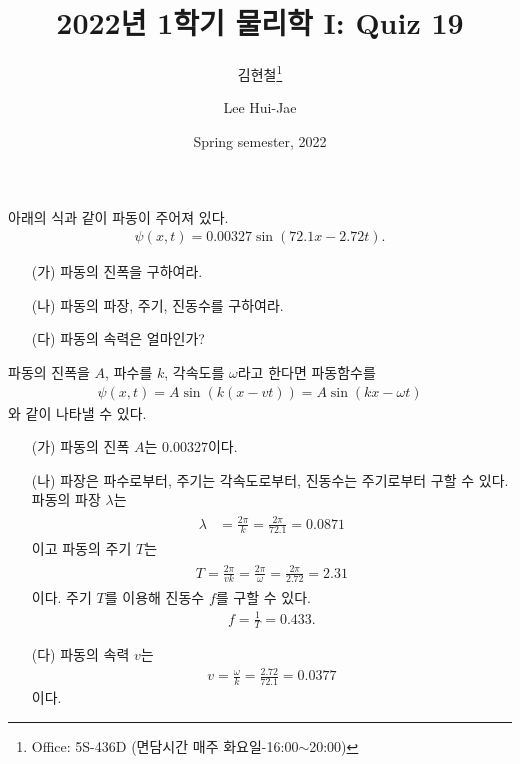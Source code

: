 \documentclass[floatfix,nofootinbib,superscriptaddress,fleqn]{revtex4-2}
\begin{document}
\title{\Large 2022년 1학기 물리학 I: Quiz 19}
\author{김현철\footnote{Office: 5S-436D (면담시간 매주
    화요일-16:00$\sim$20:00)}} 
\author{Lee Hui-Jae} 
\date{Spring semester, 2022}


\vspace{1.cm}

\maketitle

\vspace{1.cm}
아래의 식과 같이 파동이 주어져 있다. 
\begin{align}
  \label{eq:2}
\psi(x,t) = 0.00327 \sin(72.1x-2.72 t).  
\end{align}
\begin{itemize}
\item[(가)] 파동의 진폭을 구하여라.
\item[(나)] 파동의 파장, 주기, 진동수를 구하여라.
\item[(다)] 파동의 속력은 얼마인가?
\end{itemize}
\vspace{1.cm}
파동의 진폭을 $A$, 파수를 $k$, 각속도를 $\omega$라고 한다면 파동함수를
\begin{align}
  \psi(x,t) = A \sin(k(x-v t))   = A \sin(kx-\omega t)   
\end{align}
와 같이 나타낼 수 있다.
\begin{itemize}
  \item[(가)] 
  파동의 진폭 $A$는 $ 0.00327$이다.
  \item[(나)]
  파장은 파수로부터, 주기는 각속도로부터, 진동수는 주기로부터 구할 수 있다.
  파동의 파장 $\lambda$는 
  \begin{align}
    \begin{split}
      \lambda &= \frac{2\pi}{k} = \frac{2\pi}{72.1} 
      =0.0871
    \end{split}
  \end{align}
  이고 파동의 주기 $T$는 
  \begin{align}
    \begin{split}
      T = \frac{2\pi}{vk} = \frac{2\pi}{\omega}
      = \frac{2\pi}{2.72} = 2.31
    \end{split}
  \end{align}
  이다. 주기 $T$를 이용해 진동수 $f$를 구할 수 있다.
  \begin{align}
    f = \frac{1}{T} = 0.433.
  \end{align}
  \item[(다)]
  파동의 속력 $v$는
  \begin{align}
    v = \frac{\omega}{k} = \frac{2.72}{72.1} = 0.0377
  \end{align}
  이다.
\end{itemize}
\end{document}
